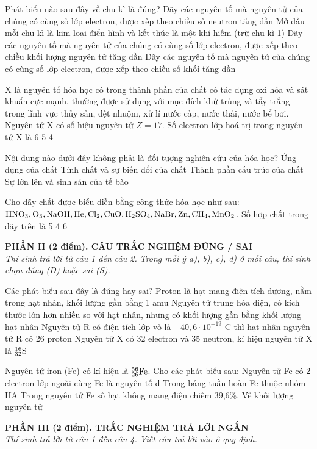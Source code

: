 \documentclass[11pt,a4paper]{article}
\begin{document}
\begin{ex}
Phát biểu nào sau đây về chu kì là đúng?
\choice
{Dãy các nguyên tố mà nguyên tử của chúng có cùng số lớp electron, được xếp theo chiều số neutron tăng dần}
{\True Mở đầu mỗi chu kì là kim loại điển hình và kết thúc là một khí hiếm (trừ chu kì 1)}
{Dãy các nguyên tố mà nguyên tử của chúng có cùng số lớp electron, được xếp theo chiều khối lượng nguyên tử tăng dần}
{Dãy các nguyên tố mà nguyên tử của chúng có cùng số lớp electron, được xếp theo chiều số khối tăng dần}
\end{ex}
\begin{ex}
X là nguyên tố hóa học có trong thành phần của chất có tác dụng oxi hóa và sát khuẩn cực mạnh, thường được sử dụng với mục đích khử trùng và tẩy trắng trong lĩnh vực thủy sản, dệt nhuộm, xử lí nước cấp, nước thải, nước bể bơi. Nguyên tử X có số hiệu nguyên tử $Z = 17$. Số electron lớp hoá trị trong nguyên tử X là
\choice
{}
{6}
{5}
{4}
\end{ex}
\begin{ex}
Nội dung nào dưới đây không phải là đối tượng nghiên cứu của hóa học?
\choice
{Ứng dụng của chất}
{Tính chất và sự biến đổi của chất}
{Thành phần cấu trúc của chất}
{\True Sự lớn lên và sinh sản của tế bào}
\end{ex}
\begin{ex}
Cho dãy chất được biểu diễn bằng công thức hóa học như sau: $\ce{HNO3, O3, NaOH, He, Cl2, CuO, H2SO4, NaBr, Zn, CH4, MnO2}$. Số hợp chất trong dãy trên là
\choice
{}
{5}
{4}
{6}
\end{ex}
\vspace{4pt}
\noindent
{\color{mainGreen}\textbf{\large PHẦN II (2 điểm). CÂU TRẮC NGHIỆM ĐÚNG / SAI}}\\
\textit{\small Thí sinh trả lời từ câu 1 đến câu 2. Trong mỗi ý a), b), c), d) ở mỗi câu, thí sinh chọn đúng (Đ) hoặc sai (S).}
\vspace{2pt}

\begin{ex}
Các phát biểu sau đây là đúng hay sai?
\choiceTF
{\True Proton là hạt mang điện tích dương, nằm trong hạt nhân, khối lượng gần bằng 1 amu}
{\True Nguyên tử trung hòa điện, có kích thước lớn hơn nhiều so với hạt nhân, nhưng có khối lượng gần bằng khối lượng hạt nhân}
{Nguyên tử R có điện tích lớp vỏ là $-40,6\cdot 10^{-19}\text{ C}$ thì hạt nhân nguyên tử R có 26 proton}
{Nguyên tử X có 32 electron và 35 neutron, kí hiệu nguyên tử X là $^{16}_{32}\ce{S}$}
\end{ex}
\begin{ex}
Nguyên tử iron (Fe) có kí hiệu là $^{56}_{26}\ce{Fe}$. Cho các phát biểu sau:
\choiceTF
{\True Nguyên tử Fe có 2 electron lớp ngoài cùng}
{\True Fe là nguyên tố d}
{Trong bảng tuần hoàn Fe thuộc nhóm IIA}
{Trong nguyên tử Fe số hạt không mang điện chiếm 39,6\%. Về khối lượng nguyên tử}
\end{ex}
\vspace{4pt}
\noindent
{\color{mainGreen}\textbf{\large PHẦN III (2 điểm). TRẮC NGHIỆM TRẢ LỜI NGẮN}}\\
\textit{\small Thí sinh trả lời từ câu 1 đến câu 4. Viết câu trả lời vào ô quy định.}
\vspace{2pt}
\end{document}

